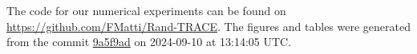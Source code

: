 The code for our numerical experiments can be found on \url{https://github.com/FMatti/Rand-TRACE}. The figures and tables were generated from the commit \href{https://github.com/FMatti/Rand-TRACE/tree/9a5f9ad}{9a5f9ad} on 2024-09-10 at 13:14:05 UTC.
